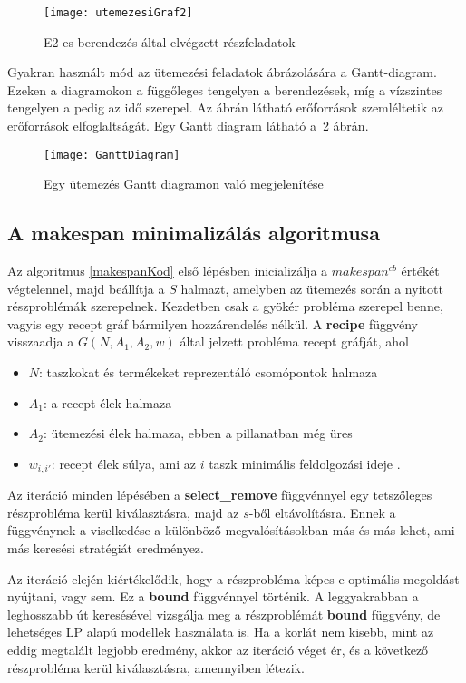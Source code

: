 \begin{figure}[H]
\begin{center}
\texttt{[image: utemezesiGraf2]}
\caption{E2-es berendezés által elvégzett részfeladatok}
\label{utemezesiGraf2}
\end{center}
\end{figure}
Gyakran használt mód az ütemezési feladatok ábrázolására a Gantt-diagram\cite{ganttwwf}\cite{ganttofw}. Ezeken a diagramokon a függőleges tengelyen a berendezések, míg a vízszintes tengelyen a pedig az idő szerepel. Az ábrán látható erőforrások szemléltetik az erőforrások elfoglaltságát. Egy Gantt diagram látható a~\ref{GanttDiagram} ábrán.
\begin{figure}[H]
\begin{center}
\texttt{[image: GanttDiagram]}
\caption{Egy ütemezés Gantt diagramon való megjelenítése}
\label{GanttDiagram}
\end{center}
\end{figure}

\subsection{A makespan minimalizálás algoritmusa}
Az algoritmus \ref{makespanKod} első lépésben inicializálja a $makespan^{cb}$ értékét végtelennel, majd beállítja a $S$ halmazt, amelyben az ütemezés során a nyitott részproblémák szerepelnek. Kezdetben csak a gyökér probléma szerepel benne, vagyis egy recept gráf bármilyen hozzárendelés nélkül. A \textbf{recipe} függvény visszaadja a $G(N,A_1,A_2,w)$ által jelzett probléma recept gráfját, ahol
\begin{itemize}
  \item[] $N$: taszkokat és termékeket reprezentáló csomópontok halmaza	
  \item[] $A_1$: a recept élek halmaza
  \item[] $A_2$: ütemezési élek halmaza, ebben a pillanatban még üres
  \item[] $w_{i,i'}$: recept élek súlya, ami az $i$ taszk minimális feldolgozási ideje .
\end{itemize}

Az iteráció minden lépésében a \textbf{select\_remove} függvénnyel egy tetszőleges részprobléma kerül kiválasztásra, majd az $s$-ből eltávolításra. Ennek a függvénynek a viselkedése a különböző megvalósításokban más és más lehet, ami más keresési stratégiát eredményez.

Az iteráció elején kiértékelődik, hogy a részprobléma képes-e optimális megoldást nyújtani, vagy sem. Ez a \textbf{bound} függvénnyel történik. A leggyakrabban a leghosszabb út keresésével vizsgálja meg a részproblémát \textbf{bound} függvény, de lehetséges LP alapú modellek használata is. Ha a korlát nem kisebb, mint az eddig megtalált legjobb eredmény, akkor az iteráció véget ér, és a következő részprobléma kerül kiválasztásra, amennyiben létezik.

